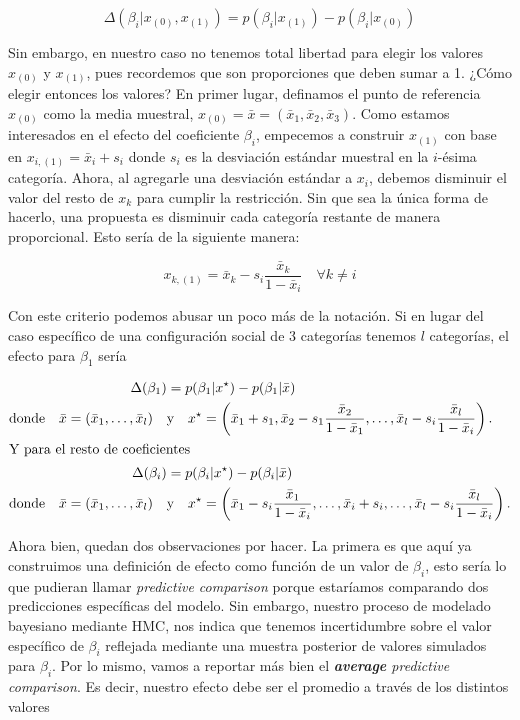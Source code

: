 \begin{equation*}
\Delta(\beta_i|x_{(0)},x_{(1)}) = p(\beta_i|x_{(1)})-p(\beta_i|x_{(0)})
\end{equation*}

Sin embargo, en nuestro caso no tenemos total libertad para elegir los valores $x_{(0)}$ y $x_{(1)}$, pues recordemos que son proporciones que deben sumar a 1. ¿Cómo elegir entonces los valores? En primer lugar, definamos el punto de referencia $x_{(0)}$ como la media muestral, $x_{(0)}=\bar{x}=(\bar{x}_1,\bar{x}_2,\bar{x}_3)$. Como estamos interesados en el efecto del coeficiente $\beta_i$, empecemos a construir $x_{(1)}$ con base en $x_{i,(1)}=\bar{x}_i + s_i$ donde $s_i$ es la desviación estándar muestral en la $i$-ésima categoría. Ahora, al agregarle una desviación estándar a $x_i$, debemos disminuir el valor del resto de $x_k$ para cumplir la restricción. Sin que sea la única forma de hacerlo, una propuesta es disminuir cada categoría restante de manera proporcional. Esto sería de la siguiente manera: 

\begin{equation*}
x_{k,(1)}=\bar{x}_k - s_i \dfrac{\bar{x}_k}{1-\bar{x}_i} \quad \forall k \neq i
\end{equation*}

Con este criterio podemos abusar un poco más de la notación. Si en lugar del caso específico de una configuración social de 3 categorías tenemos $l$ categorías, el efecto para $\beta_1$ sería

\begin{align}\label{eq:Efecto_Enchufado}
\Delta(\beta_1) &= p(\beta_1|x^\star)-p(\beta_1|\bar{x}) \nonumber \\
\text{donde} \quad \bar{x} = (\bar{x}_1,\dots,\bar{x}_{l}) \quad &\text{y} \quad x^\star = \left(\bar{x}_1 + s_1,\bar{x}_2 - s_1\dfrac{\bar{x}_2}{1- \bar{x}_1},\dots,\bar{x}_{l} - s_i\dfrac{\bar{x}_{l}}{1-\bar{x}_i}\right). \nonumber \\
\intertext{Y para el resto de coeficientes}
\Delta(\beta_i) &= p(\beta_i|x^\star)-p(\beta_i|\bar{x}) \nonumber \\
\text{donde} \quad \bar{x} = (\bar{x}_1,\dots,\bar{x}_{l}) \quad &\text{y} \quad x^\star = \left(\bar{x}_1 - s_i\dfrac{\bar{x}_1}{1-\bar{x}_i},\dots,\bar{x}_i + s_i,\dots, \bar{x}_{l} - s_i\dfrac{\bar{x}_{l}}{1-\bar{x}_i}\right).
\end{align}

Ahora bien, quedan dos observaciones por hacer. La primera es que aquí ya construimos una definición de efecto como función de un valor de $\beta_i$, esto sería lo que \textcite{GelmanHill06} pudieran llamar \textit{predictive comparison} porque estaríamos comparando dos predicciones específicas del modelo. Sin embargo, nuestro proceso de modelado bayesiano mediante HMC, nos indica que tenemos incertidumbre sobre el valor específico de $\beta_i$ reflejada mediante una muestra posterior de valores simulados para $\beta_i$. Por lo mismo, vamos a reportar más bien el \textit{\textbf{average} predictive comparison}. Es decir, nuestro efecto debe ser el promedio a través de los distintos valores